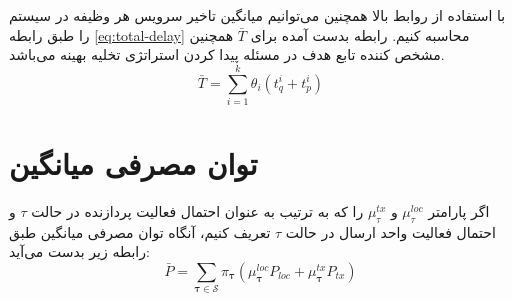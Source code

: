 با استفاده از روابط بالا همچنین می‌توانیم میانگین تاخیر سرویس هر وظیفه در سیستم را طبق رابطه \ref{eq:total-delay} محاسبه کنیم. رابطه بدست آمده برای $\bar{T}$ همچنین مشخص کننده تابع هدف در مسئله پیدا کردن استراتژی تخلیه بهینه می‌باشد.
\begin{equation}
	\label{eq:total-delay}
	\bar{T}=\sum_{i=1}^{k} \theta_{i}\left(t_{q}^{i}+t_{p}^{i}\right)
\end{equation}
\newpage
\section{توان مصرفی میانگین}
اگر پارامتر
$\mu_\tau^{loc}$
و 
$\mu_\tau^{tx}$
را که به ترتیب به عنوان احتمال فعالیت پردازنده در حالت
$\tau$
و احتمال فعالیت واحد ارسال در حالت
$\tau$
تعریف کنیم، آنگاه توان مصرفی میانگین طبق رابطه زیر بدست می‌آید:
\begin{equation}
	\bar{P}=\sum_{\boldsymbol{\tau} \in \mathcal{S}} \pi_{\boldsymbol{\tau}}\left(\mu_{\boldsymbol{\tau}}^{l o c} P_{l o c}+\mu_{\boldsymbol{\tau}}^{t x} P_{t x}\right)
\end{equation}

